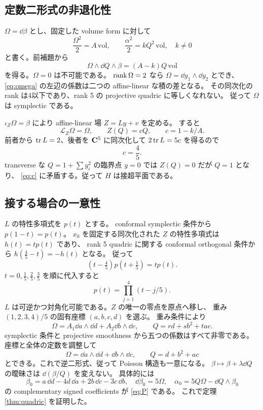 \documentclass[11pt,a4paper]{ltjsarticle}
\theoremstyle{remark}\newtheorem{remark}[theorem]{注意}\renewcommand{\proofname}{証明}
\begin{document}
\subsection{定数二形式の非退化性}
$\Omega=\dd\beta$ とし、固定した volume form に対して
\[
 \frac{\Omega^2}{2}=A\,\mathrm{vol},\qquad
 \frac{\alpha^2}{2}=kQ^2\,\mathrm{vol},\quad k\ne0
\]
と書く。前補題から
\begin{equation}\label{eq:omega}
 \Omega\wedge\dd Q\wedge\beta=(A-k)Q\,\mathrm{vol}
\end{equation}
を得る。$\Omega=0$ は不可能である。
$\operatorname{rank}\Omega=2$ なら $\Omega=\dd y_1\wedge\dd y_2$ とでき、
\eqref{eq:omega} の左辺の係数は二つの affine-linear な積の差となる。
その同次化の rank は4以下であり、rank 5 の projective quadric に等しくなれない。
従って $\Omega$ は symplectic である。

$\iota_Z\Omega=\beta$ により affine-linear 場 $Z=Ly+v$ を定める。
すると
\[
 \mathcal L_Z\Omega=\Omega,\qquad Z(Q)=cQ,\qquad c=1-k/A.
\]
前者から $\operatorname{tr} L=2$、後者を $\mathbf C^5$ に同次化して
$2\operatorname{tr} L=5c$ を得るので
\begin{equation}\label{eq:c}
 c=\frac45.
\end{equation}
transverse な $Q=1+\sum y_i^2$ の臨界点 $y=0$ では $Z(Q)=0$ だが $Q=1$ となり、
\eqref{eq:c} に矛盾する。従って $H$ は接超平面である。

\subsection{接する場合の一意性}
$L$ の特性多項式を $p(t)$ とする。
conformal symplectic 条件から $p(1-t)=p(t)$。
$x_0$ を固定する同次化された $Z$ の特性多項式は $h(t)=tp(t)$ であり、
rank 5 quadric に関する conformal orthogonal 条件から
$h(\tfrac45-t)=-h(t)$ となる。
従って
\[
 (t-\tfrac45)p(t+\tfrac15)=tp(t).
\]
$t=0,\tfrac15,\tfrac25,\tfrac35$ を順に代入すると
\[
 p(t)=\prod_{j=1}^4(t-j/5).
\]
$L$ は可逆かつ対角化可能である。$Z$ の唯一の零点を原点へ移し、
重み $(1,2,3,4)/5$ の固有座標 $(a,b,c,d)$ を選ぶ。
重み条件により
\[
 \Omega=A_1\dd a\wedge\dd d+A_2\dd b\wedge\dd c,\qquad
 Q=r d+s b^2+t ac.
\]
symplectic 条件と projective smoothness から五つの係数はすべて非零である。
座標と全体の定数を調整して
\[
 \Omega=\dd a\wedge\dd d+\dd b\wedge\dd c,\qquad
 Q=d+b^2+ac
\]
とできる。これで逆二形式、従って Poisson 構造も一意になる。
$\beta\mapsto\beta+\lambda\dd Q$ の曖昧さは
$\dd(\beta/Q)$ を変えない。
具体的には
\[
 \beta_0=a\,\dd d-4d\,\dd a+2b\,\dd c-3c\,\dd b,\quad
 \dd\beta_0=5\Omega,\quad
 \alpha_0=5Q\Omega-\dd Q\wedge\beta_0
\]
の complementary signed coefficients が \eqref{eq:P} である。
これで定理 \ref{thm:quadric} を証明した。
\end{document}
